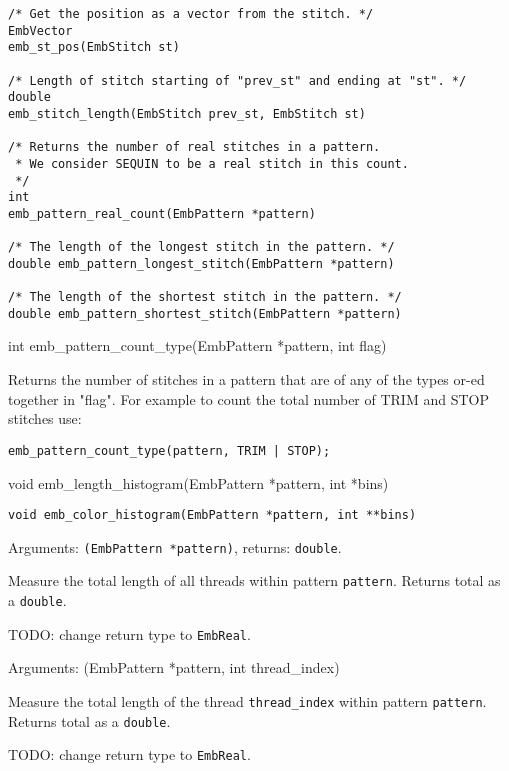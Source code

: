 \begin{lstlisting}
/* Get the position as a vector from the stitch. */
EmbVector
emb_st_pos(EmbStitch st)

/* Length of stitch starting of "prev_st" and ending at "st". */
double
emb_stitch_length(EmbStitch prev_st, EmbStitch st)

/* Returns the number of real stitches in a pattern.
 * We consider SEQUIN to be a real stitch in this count.
 */
int
emb_pattern_real_count(EmbPattern *pattern)

/* The length of the longest stitch in the pattern. */
double emb_pattern_longest_stitch(EmbPattern *pattern)

/* The length of the shortest stitch in the pattern. */
double emb_pattern_shortest_stitch(EmbPattern *pattern)
\end{lstlisting}


int emb\_pattern\_count\_type(EmbPattern *pattern, int flag)

Returns the number of stitches in a pattern that are of any of the types
or-ed together in "flag". For example to count the total number of
TRIM and STOP stitches use:

\begin{lstlisting}
emb_pattern_count_type(pattern, TRIM | STOP);
\end{lstlisting}


void emb\_length\_histogram(EmbPattern *pattern, int *bins)


\texttt{void emb\_color\_histogram(EmbPattern *pattern, int **bins)}


Arguments: \texttt{(EmbPattern *pattern)}, returns: \texttt{double}.

Measure the total length of all threads within
pattern \texttt{pattern}. Returns total as a \texttt{double}.

TODO: change return type to \texttt{EmbReal}.


Arguments: (EmbPattern *pattern, int thread\_index)

Measure the total length of the thread \texttt{thread\_index} within
pattern \texttt{pattern}. Returns total as a \texttt{double}.

TODO: change return type to \texttt{EmbReal}.

